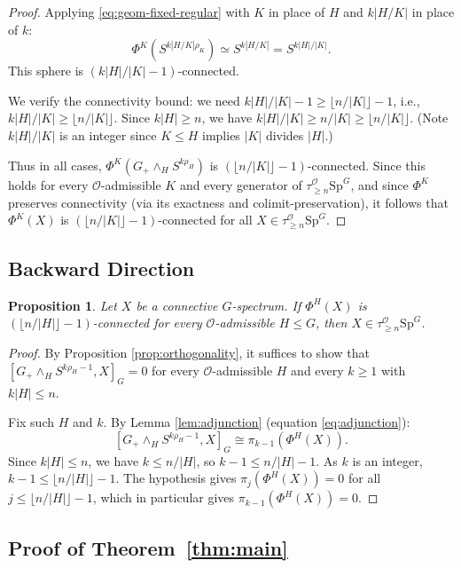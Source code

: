 \documentclass[12pt]{article}
\newtheorem{proposition}[theorem]{Proposition}
\theoremstyle{definition}
\newcommand{\calO}{\mathcal{O}}
\newcommand{\SpG}{\mathrm{Sp}^G}
\newcommand{\floor}[1]{\lfloor #1 \rfloor}
\begin{document}
\begin{proof}
Applying \eqref{eq:geom-fixed-regular} with $K$ in place of $H$ and $k|H/K|$ in place of $k$:
\begin{equation}
\label{eq:geom-fixed-subgroup}
  \Phi^K\!\left(S^{k|H/K|\rho_K}\right) \simeq S^{k|H/K|} = S^{k|H|/|K|}.
\end{equation}
This sphere is $(k|H|/|K| - 1)$-connected.

We verify the connectivity bound: we need $k|H|/|K| - 1 \geq \floor{n/|K|} - 1$, i.e.,
$k|H|/|K| \geq \floor{n/|K|}$.
Since $k|H| \geq n$, we have $k|H|/|K| \geq n/|K| \geq \floor{n/|K|}$.
(Note $k|H|/|K|$ is an integer since $K \leq H$ implies $|K|$ divides $|H|$.)

Thus in all cases, $\Phi^K(G_+ \wedge_H S^{k\rho_H})$ is $(\floor{n/|K|}-1)$-connected.
Since this holds for every $\calO$-admissible $K$ and every generator of
$\tau_{\geq n}^{\calO}\SpG$, and since $\Phi^K$ preserves connectivity (via its exactness
and colimit-preservation), it follows that $\Phi^K(X)$ is $(\floor{n/|K|}-1)$-connected
for all $X \in \tau_{\geq n}^{\calO}\SpG$.
\end{proof}

\subsection{Backward Direction}

\begin{proposition}
\label{prop:backward}
Let $X$ be a connective $G$-spectrum. If $\Phi^H(X)$ is $(\floor{n/|H|}-1)$-connected for
every $\calO$-admissible $H \leq G$, then $X \in \tau_{\geq n}^{\calO}\SpG$.
\end{proposition}

\begin{proof}
By Proposition \ref{prop:orthogonality}, it suffices to show that
$[G_+ \wedge_H S^{k\rho_H - 1}, X]_G = 0$
for every $\calO$-admissible $H$ and every $k \geq 1$ with $k|H| \leq n$.

Fix such $H$ and $k$. By Lemma \ref{lem:adjunction} (equation \eqref{eq:adjunction}):
\[
  [G_+ \wedge_H S^{k\rho_H - 1}, X]_G \cong \pi_{k-1}(\Phi^H(X)).
\]
Since $k|H| \leq n$, we have $k \leq n/|H|$, so $k - 1 \leq n/|H| - 1$. As $k$ is
an integer, $k - 1 \leq \floor{n/|H|} - 1$. The hypothesis gives $\pi_j(\Phi^H(X)) = 0$
for all $j \leq \floor{n/|H|} - 1$, which in particular gives $\pi_{k-1}(\Phi^H(X)) = 0$.
\end{proof}

\subsection{Proof of Theorem~\ref{thm:main}}
\end{document}
